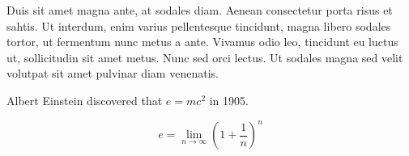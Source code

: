 \documentclass[10pt,a4paper]{moderncv}        %
\begin{document}
Duis sit amet magna ante, at sodales diam. Aenean consectetur porta risus et sahtis. Ut interdum, enim varius pellentesque tincidunt, magna libero sodales tortor, ut fermentum nunc metus a ante. Vivamus odio leo, tincidunt eu luctus ut, sollicitudin sit amet metus. Nunc sed orci lectus. Ut sodales magna sed velit volutpat sit amet pulvinar diam venenatis.

Albert Einstein discovered that $e=mc^2$ in 1905.

\[ e=\lim_{n \to \infty} \left(1+\frac{1}{n}\right)^n \]

\makeletterclosing

\end{document}
